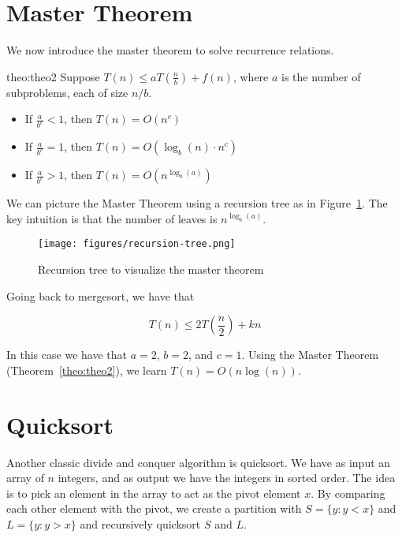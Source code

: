 
\section{Master Theorem}

We now introduce the master theorem to solve recurrence relations.


\begin{theo}{theo:theo2}
Suppose $T(n) \leq aT(\frac{n}{b}) + f(n)$, where $a$ is the number of
subproblems, each of size $n/b$.
\begin{itemize}
    \item If $\frac{a}{b^c} < 1$, then $T(n) = O(n^c)$
    \item If $\frac{a}{b^c} = 1$, then $T(n) = O(\log_b(n) \cdot n^c)$
    \item If $\frac{a}{b^c} > 1$, then $T(n) = O(n^{\log_b(a)})$
\end{itemize}
\end{theo}

We can picture the Master Theorem using a recursion tree as in 
Figure~\ref{fig:recursion-tree}. The key intuition is that the number
of leaves is $n^{\log_b(a)}$.

\begin{figure}
    \centering
    \texttt{[image: figures/recursion-tree.png]}
    \caption{Recursion tree to visualize the master theorem}
    \label{fig:recursion-tree}
\end{figure}

Going back to mergesort, we have that

$$
T(n) \leq 2T(\frac{n}{2}) + kn
$$

In this case we have that $a = 2$, $b = 2$, and $c = 1$. Using
the Master Theorem (Theorem~\ref{theo:theo2}), we learn
$T(n) = O(n\log(n))$.

\section{Quicksort}

Another classic divide and conquer algorithm is quicksort. We have
as input an array of $n$ integers, and as output we have the integers
in sorted order. The idea is to pick an element in the array to act as
the pivot element $x$. By comparing each other element with the pivot,
we
create a partition with $S = \{ y : y < x \}$ and $L = \{y : y > x \}$
and recursively quicksort $S$ and $L$.


